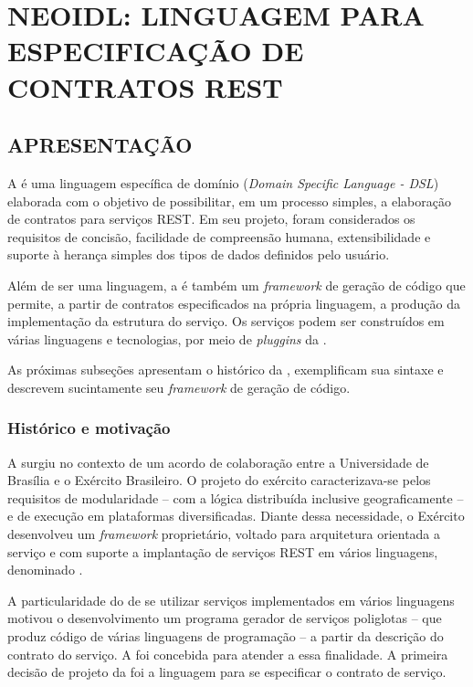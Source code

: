 \chapter{NEOIDL: LINGUAGEM PARA ESPECIFICAÇÃO DE CONTRATOS REST	}
\vspace{-6mm}


\section{APRESENTAÇÃO}
\label{apresentacaoNeoIDL}

A \neoidl{} é uma linguagem específica de domínio (\textit{Domain Specific
Language - DSL}) elaborada com o objetivo de possibilitar, em um processo
simples, a elaboração de contratos para serviços REST. Em seu projeto, 
foram considerados os requisitos de concisão, facilidade de compreensão humana,
extensibilidade e suporte à herança simples dos tipos de dados definidos pelo
usuário.

Além de ser uma linguagem, a \neoidl{} é também um \textit{framework} de geração
de código que permite, a partir de contratos especificados na própria
linguagem, a produção da implementação da estrutura do serviço. Os serviços
podem ser construídos em várias linguagens e tecnologias, por meio
de \textit{pluggins} da \neoidl{}.

As próximas subseções apresentam o histórico da \neoidl{}, exemplificam sua
sintaxe e descrevem sucintamente seu \textit{framework} de geração de código.


\subsection{Histórico e motivação}
\label{histMotivNeoIDL}
\vspace{-6mm}

A \neoidl{} surgiu no contexto de um acordo de colaboração entre a Universidade
de Brasília e o Exército Brasileiro. O projeto do exército caracterizava-se
pelos requisitos de modularidade -- com a lógica distribuída inclusive
geograficamente -- e de execução em plataformas diversificadas. Diante dessa
necessidade, o Exército desenvolveu um \textit{framework} proprietário,
voltado para arquitetura orientada a serviço e com suporte
a implantação de serviços REST em vários linguagens, denominado \neocortex{}.

A particularidade do \neocortex{} de se utilizar serviços implementados em
vários linguagens motivou o desenvolvimento um programa gerador de serviços
poliglotas -- que produz código de várias linguagens de programação -- a partir da
descrição do contrato do serviço. A \neoidl{} foi concebida para atender a essa
finalidade. A primeira decisão de projeto da \neoidl{} foi a linguagem para se
especificar o contrato de serviço.

